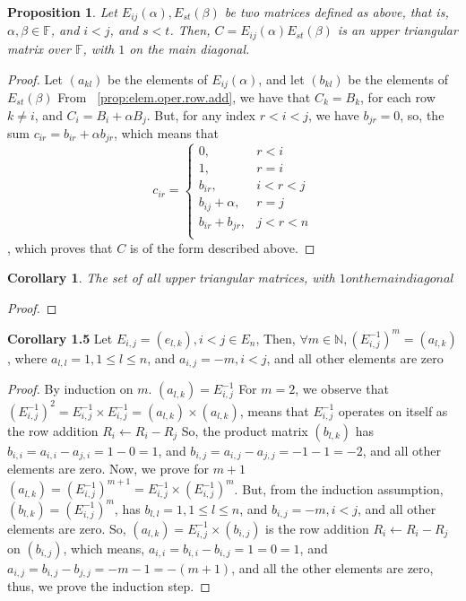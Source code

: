\documentclass[12pt]{article}
\newtheorem{proposition}[theorem]{Proposition}
\newtheorem{corollary}[theorem]{Corollary}
\begin{document}
\begin{proposition}
Let $E_{ij}(\alpha),E_{st}(\beta)$ be two matrices defined as above, that is, $\alpha,\beta \in \mathbb{F}$, and $i<j$, and $s<t$. Then, $C=E_{ij}(\alpha)E_{st}(\beta)$ is an upper triangular matrix over $\mathbb{F}$, with $1$ on the main diagonal.
\end{proposition}
\begin{proof}
Let $(a_{kl})$ be the elements of $E_{ij}(\alpha)$, and let $(b_{kl})$ be the elements of $E_{st}(\beta)$
From ~\ref{prop:elem.oper.row.add}, we have that $C_k=B_k$, for each row $k \neq i$, and $C_i=B_i+\alpha B_j$. But, for any index $r<i<j$, we have $b_{jr}=0$, so, the sum $c_{ir}=b_{ir}+\alpha b_{jr}$, which means that $$
c_{ir}=\begin{cases}
		0, & r<i\\
            1, & r=i\\
            b_{ir}, & i<r<j \\
            b_{ij}+\alpha, & r=j\\
            b_{ir}+b_{jr}, & j<r<n\\
		 \end{cases}
$$, which proves that $C$ is of the form described above.
\end{proof}
\begin{corollary}
The set of all upper triangular matrices, with $1 on the main diagonal$
\end{corollary}
\begin{proof}
\end{proof}
\newpage
\textbf{Corollary 1.5} \newline
Let $E_{i,j}=(e_{l,k}),i<j \in E_n$, Then,\newline
$\forall m \in \mathbb{N},(E_{i,j}^{-1})^m=(a_{l,k})$, where $a_{l,l}=1,1 \leq l \leq n$, and $a_{i,j}=-m,i<j$, and all other elements are zero
\begin{proof}
By induction on $m$. \newline
$(a_{l,k})=E_{i,j}^{-1}$
For $m=2$, we observe that $(E_{i,j}^{-1})^2=E_{i,j}^{-1} \times E_{i,j}^{-1}=(a_{l,k}) \times (a_{l,k})$, means that $E_{i,j}^{-1}$ operates on itself as the row addition $R_i \leftarrow R_i-R_j$ \newline
So, the product matrix $(b_{l,k})$ has $b_{i,i}=a_{i,i}-a_{j,i}=1-0=1$, and $b_{i,j}=a_{i,j}-a_{j,j}=-1-1=-2$, and all other elements are zero. \newline
Now, we prove for $m+1$ \newline
$(a_{l,k})=(E_{i,j}^{-1})^{m+1}=E_{i,j}^{-1} \times (E_{i,j}^{-1})^m$. But, from the induction assumption, $(b_{l,k})=(E_{i,j}^{-1})^m$, has $b_{l,l}=1,1 \leq l \leq n$, and $b_{i,j}=-m,i<j$, and all other elements are zero. \newline
So, $(a_{l,k})=E_{i,j}^{-1} \times (b_{i,j})$ is the row addition $R_i \leftarrow R_i-R_j$ on $(b_{i,j})$, which means, $a_{i,i}=b_{i,i}-b_{i,j}=1=0=1$, and $a_{i,j}=b_{i,j}-b_{j,j}=-m-1=-(m+1)$, and all the other elements are zero, thus, we prove the induction step. \newline
\end{proof}
\end{document}
